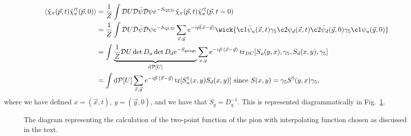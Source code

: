 \begin{align}
    \langle \tilde{\chi}_\pi(\vec{p},t) \tilde{\chi}^{\prime \dagger}_\pi(\vec{p}, 0)\rangle 
    &= \frac{1}{Z}\int \mathcal{D}U\mathcal{D}\bar{\psi}\mathcal{D}\psi e^{- S_{\rm QCD}} \tilde{\chi}_\pi(\vec{p}, t) \tilde\chi^{\prime \dagger}_\pi(\vec{p}, t=0) \nonumber \\
    &= \frac{1}{Z}\int \mathcal{D}U \mathcal{D} \bar{\psi} \mathcal{D}\psi e^{-S_\text{QCD}} \sum_{\vec{x}, \vec{y}}e^{- i \vec{p}\dot(\vec{x} - \vec{y})} \wick{ \c1{\bar{\psi}_u(\vec x,t)} \gamma_5 \c2{\psi_d(\vec x,t)} \c2{\bar{\psi}_d(\vec y,0)} \gamma_5 \c1{\psi_u(\vec y,0)}} \nonumber \\
    &= \int \underset{\text{d}\mathcal{P}[U]}{\underbrace{\frac{1}{Z}\mathcal{D}U \operatorname{det}D_u \operatorname{det}D_d e^{-S_\text{gauge}}}} \sum_{x,y} e^{- i \vec{p} \cdot (\vec{x} - \vec{y})} \operatorname{tr}_{DC}[S_u(y, x), \gamma_5, S_d(x, y), \gamma_5] \nonumber \\
    &= \int \text{d}\mathcal{P}[U]\sum_{\vec x,\vec y}e^{-i \vec{p} \cdot(\vec{x} - \vec{y})} \operatorname{tr}[S_u^\dagger(x,y)S_d(x,y)] \text{ since }S(x,y) = \gamma_5 S^\dagger(y,x) \gamma_5 \nonumber,
\end{align}
where we have defined $x = (\vec{x}, t),\ y = (\vec{y}, 0)$, and we have that $S_q = D_q^{-1}$.
%
This is represented diagrammatically in Fig.~\ref{fig:two_pt_pion}.
\begin{figure}
    \centering
    \caption{The diagram representing the calculation of the two-point function of the pion with interpolating function chosen as discussed in the text.}
    \label{fig:two_pt_pion}
\end{figure}

